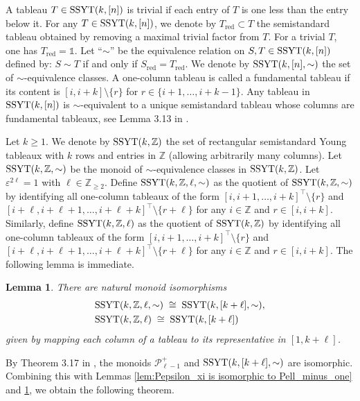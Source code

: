 \documentclass[11pt, reqno]{amsart}
\theoremstyle{plain}
\newtheorem{lemma}[theorem]{Lemma}
\theoremstyle{definition}
\numberwithin{equation}{section}
\newcommand{\ZZ}{{\mathbb {Z}}}
\newcommand{\SSYT}{{\rm SSYT}}
\begin{document}
A tableau $T \in {\rm SSYT}(k, [n])$ is trivial if each entry of $T$ is one less than the entry below it. For any $T \in {\rm SSYT}(k, [n])$, we denote by $T_{\text{red}} \subset T$ the semistandard tableau obtained by removing a maximal trivial factor from $T$. For a trivial $T$, one has $T_{\text{red}} = \mathds{1}$. Let ``$\sim$'' be the equivalence relation on $S, T \in {\rm SSYT}(k, [n])$ defined by: $S \sim T$ if and only if $S_{\text{red}} = T_{\text{red}}$. We denote by ${\rm SSYT}(k, [n],\sim)$ the set of $\sim$-equivalence classes.
A one-column tableau is called a fundamental tableau if its content is $[i,i+k] \setminus \{r\}$ for $r \in \{i+1, \ldots, i+k-1\}$.
Any tableau in $\SSYT(k,[n])$ is $\sim$-equivalent to a unique semistandard tableau whose columns are fundamental tableaux, see Lemma 3.13 in \cite{CDFL20}. 

Let $k \ge 1$. We denote by ${\rm SSYT}(k, \ZZ)$ the set of rectangular semistandard Young tableaux with $k$ rows and entries in $\ZZ$ (allowing arbitrarily many columns). Let ${\rm SSYT}(k, \ZZ, \sim)$ be the monoid of $\sim$-equivalence classes in ${\rm SSYT}(k, \ZZ)$.
Let $\varepsilon^{2\ell} = 1$ with $\ell \in \mathbb{Z}_{\ge 2}$. Define ${\rm SSYT}(k, \mathbb{Z},  \ell, \sim)$ as the quotient of ${\rm SSYT}(k, \mathbb{Z}, \sim)$ by identifying all one-column tableaux of the form $[i, i+1, \dots, i+k]^\top \setminus \{r\}$ and $[i+\ell, i+\ell+1, \dots, i+\ell+k]^\top \setminus \{r+\ell\}$ for any $i \in \ZZ$ and $r \in [i, i+k]$. Similarly, define ${\rm SSYT}(k, \mathbb{Z},   \ell)$ as the quotient of ${\rm SSYT}(k, \mathbb{Z})$ by identifying all one-column tableaux of the form $[i, i+1, \dots, i+k]^\top \setminus \{r\}$ and $[i+\ell, i+\ell+1, \dots, i+\ell+k]^\top \setminus \{r+\ell\}$ for any $i \in \ZZ$ and $r \in [i, i+k]$. The following lemma is immediate. 

\begin{lemma}  \label{lem:quotient of SSYTkZ is isomorphic to SSYTk_ell}
There are natural monoid isomorphisms 
\begin{align*}
& {\rm SSYT}(k, \mathbb{Z},  \ell, \sim) \;\cong\; {\rm SSYT}(k, [k+\ell], \sim), \\
& {\rm SSYT}(k, \mathbb{Z},  \ell) \;\cong\; {\rm SSYT}(k, [k+\ell])
\end{align*} 
given by mapping each column of a tableau to its representative in $[1, k+\ell]$. 
\end{lemma}

By Theorem 3.17 in \cite{CDFL20}, the monoids $\mathcal{P}_{\ell-1}^+$ and $\SSYT(k, [k+\ell], \sim)$ are isomorphic. Combining this with Lemmas \ref{lem:Pepsilon_xi is isomorphic to Pell_minus_one} and \ref{lem:quotient of SSYTkZ is isomorphic to SSYTk_ell}, we obtain the following theorem.
\end{document}
